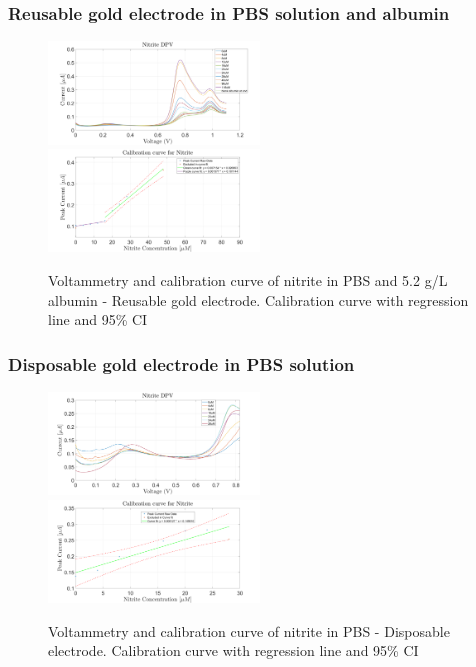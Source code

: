 \subsubsection*{Reusable gold electrode in PBS solution and albumin}
\begin{figure}[H]
    \centering
    \includegraphics[width = 0.5\textwidth]{img/reus albumin curve new.png}
    \includegraphics[width = 0.5\textwidth]{img/albumin reus calibration curve new.png}
    \caption{Voltammetry and calibration curve of nitrite in PBS and 5.2 g/L albumin - Reusable gold electrode. Calibration curve with regression line and 95\% CI} 
    \label{fig:nitrite_result_2}
\end{figure}

\subsubsection*{Disposable gold electrode in PBS solution}
\begin{figure}[H]
    \centering
    \includegraphics[width = 0.5\textwidth]{img/disp pbs new.png}
    \includegraphics[width = 0.5\textwidth]{img/newfig1.png}
    \caption{Voltammetry and calibration curve of nitrite in PBS - Disposable electrode. Calibration curve with regression line and 95\% CI}
    \label{fig:nitrite_result_3}
\end{figure}


